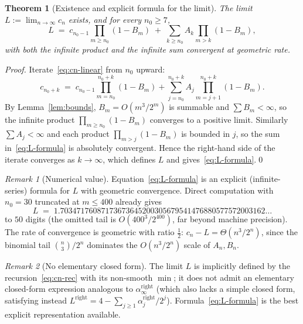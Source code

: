\documentclass{article}
\newtheorem{theorem}[proposition]{Theorem}
\theoremstyle{remark}
\newtheorem*{remark}{Remark}
\begin{document}
\begin{theorem}[Existence and explicit formula for the limit]\label{thm:L}
The limit $L:=\lim_{n\to\infty}c_{n}$ exists, and for every $n_{0}\ge 7$,
\begin{equation}\label{eq:L-formula}
  L\;=\;c_{n_{0}-1}\prod_{m\ge n_{0}}(1-B_{m})
  \;+\;\sum_{k\ge n_{0}}A_{k}\prod_{m>k}(1-B_{m}),
\end{equation}
with both the infinite product and the infinite sum convergent at
geometric rate.
\end{theorem}

\begin{proof}
Iterate~\eqref{eq:cn-linear} from $n_{0}$ upward:
\[
  c_{n_{0}+k}\;=\;c_{n_{0}-1}\prod_{m=n_{0}}^{n_{0}+k}(1-B_{m})
  +\sum_{j=n_{0}}^{n_{0}+k}A_{j}\prod_{m=j+1}^{n_{0}+k}(1-B_{m}).
\]
By Lemma~\ref{lem:bounds}, $B_{m}=O(m^{3}/2^{m})$ is summable and
$\sum B_{m}<\infty$, so the infinite product
$\prod_{m\ge n_{0}}(1-B_{m})$ converges to a positive limit. Similarly
$\sum A_{j}<\infty$ and each product $\prod_{m>j}(1-B_{m})$ is bounded
in $j$, so the sum in~\eqref{eq:L-formula} is absolutely convergent.
Hence the right-hand side of the iterate converges as $k\to\infty$,
which defines $L$ and gives~\eqref{eq:L-formula}.\qed
\end{proof}

\begin{remark}[Numerical value]
Equation~\eqref{eq:L-formula} is an explicit (infinite-series) formula
for $L$ with geometric convergence. Direct computation with
$n_{0}=30$ truncated at $m\le 400$ already gives
\[
  L\;=\;1.70347176087173673645200305679541476880577572003162\ldots
\]
to $50$ digits (the omitted tail is $O(400^{3}/2^{400})$, far beyond
machine precision). The rate of convergence is geometric with ratio
$\tfrac12$: $c_{n}-L=\Theta(n^{3}/2^{n})$, since the binomial tail
$\binom{n}{3}/2^{n}$ dominates the $O(n^{3}/2^{n})$ scale of
$A_{n},B_{n}$.
\end{remark}

\begin{remark}[No elementary closed form]
The limit $L$ is implicitly defined by the recursion~\eqref{eq:cn-rec}
with its non-smooth $\min$; it does not admit an elementary
closed-form expression analogous to $\alpha_{\infty}^{\text{right}}$
(which also lacks a simple closed form, satisfying instead
$L^{\text{right}}=4-\sum_{j\ge 1}\alpha_{j}^{\text{right}}/2^{j}$).
Formula~\eqref{eq:L-formula} is the best explicit representation
available.
\end{remark}
\end{document}
